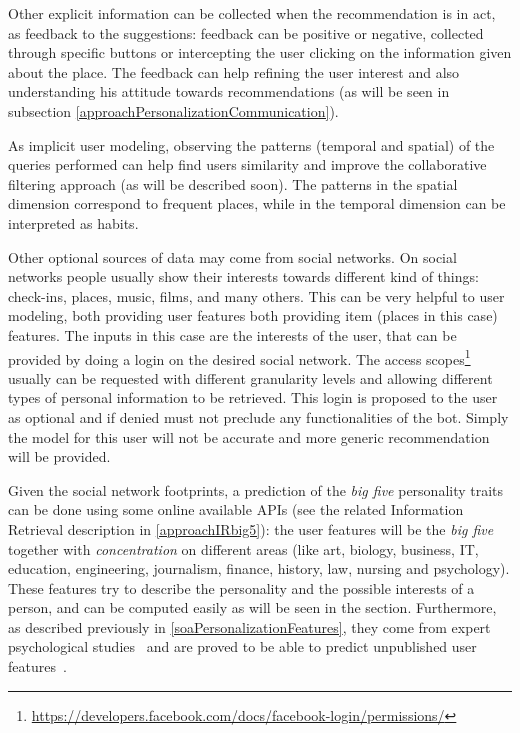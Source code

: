 Other explicit information can be collected when the recommendation is in act, as feedback to the suggestions: feedback can be positive or negative, collected through specific buttons or intercepting the user clicking on the information given about the place. The feedback can help refining the user interest and also understanding his attitude towards recommendations (as will be seen in subsection \ref{approachPersonalizationCommunication}).

As implicit user modeling, observing the patterns (temporal and spatial) of the queries performed can help find users similarity and improve the collaborative filtering approach (as will be described soon). The patterns in the spatial dimension correspond to frequent places, while in the temporal dimension can be interpreted as habits.

Other optional sources of data may come from social networks. On social networks people usually show their interests towards different kind of things: check-ins, places, music, films, and many others. This can be very helpful to user modeling, both providing user features both providing item (places in this case) features. The inputs in this case are the interests of the user, that can be provided by doing a login on the desired social network. The access scopes\footnote{\url{https://developers.facebook.com/docs/facebook-login/permissions/}} usually can be requested with different granularity levels and allowing different types of personal information to be retrieved. This login is proposed to the user as optional and if denied must not preclude any functionalities of the bot. Simply the model for this user will not be accurate and more generic recommendation will be provided.

Given the social network footprints, a prediction of the \textit{big five} personality traits can be done using some online available APIs (see the related Information Retrieval description in \ref{approachIRbig5}): the user features will be the \textit{big five} together with \textit{concentration} on different areas (like art, biology, business, IT, education, engineering, journalism, finance, history, law, nursing and psychology). These features try to describe the personality and the possible interests of a person, and can be computed easily as will be seen in the section. Furthermore, as described previously in \ref{soaPersonalizationFeatures}, they come from expert psychological studies~\cite{costa2008revised} and are proved to be able to predict unpublished user features~\cite{kosinski2013private}.

